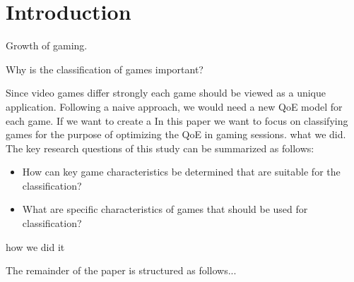
\section{Introduction}

Growth of gaming.

Why is the classification of games important?

Since video games differ strongly each game should be viewed as a unique application. Following a naive approach, we would need a new QoE model for each game. If we want to create a 
In this paper we want to focus on classifying games for the purpose of optimizing the QoE in gaming sessions.
what we did. The key research questions of this study can be summarized as follows:
\begin{itemize}
\item How can key game characteristics be determined that are suitable for the classification?
\item What are specific characteristics of games that should be used for classification?
\end{itemize}

how we did it

The remainder of the paper is structured as follows...